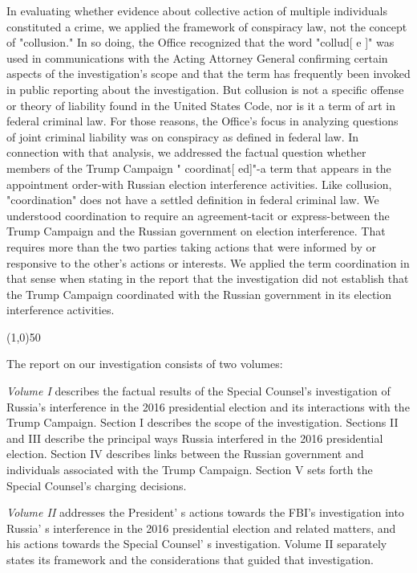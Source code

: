 \documentclass{article}
\newcommand{\hr}{\begin{center} \line(1,0){50} \end{center}}
\begin{document}
In evaluating whether evidence about collective action of multiple individuals constituted a crime, we applied the framework of conspiracy law, not the concept of "collusion." In so doing, the Office recognized that the word "collud[ e ]"  was used in communications with the Acting Attorney General confirming certain aspects of the investigation's scope and that the term has frequently been invoked in public reporting about the investigation. But collusion is not a specific offense or theory of liability found in the United States Code, nor is it  a  term of art in federal criminal law. For those reasons, the Office's focus in analyzing questions of joint criminal liability was on conspiracy as defined in federal law. In connection with that analysis, we addressed the factual question whether members of the Trump Campaign " coordinat[ ed]"-a term that appears in the appointment order-with Russian election interference activities. Like collusion, "coordination" does not have a settled definition in federal criminal law. We understood coordination to require an agreement-tacit or express-between the Trump Campaign and the Russian government on election interference. That requires more than the two parties taking actions that were informed by or responsive to the other's actions or interests. We applied the term coordination in that sense when stating in the report that the investigation did not establish that the Trump Campaign coordinated with the Russian government in its election interference activities.

\hr

The report on our investigation consists of two volumes:

\textit{Volume I} describes the factual results of the Special Counsel's investigation of Russia's interference in the 2016 presidential election and its interactions with the Trump Campaign. Section I describes the scope of the investigation. Sections II and III describe the principal ways Russia interfered in the 2016 presidential election. Section IV describes links between the Russian government and individuals associated with the Trump Campaign. Section V sets forth the Special Counsel's charging decisions.

\textit{Volume II} addresses the President' s actions towards the FBI's investigation into Russia' s interference in the 2016 presidential election and related matters, and his actions towards the Special Counsel' s investigation. Volume II separately states its framework and the considerations that guided that investigation.
\end{document}
